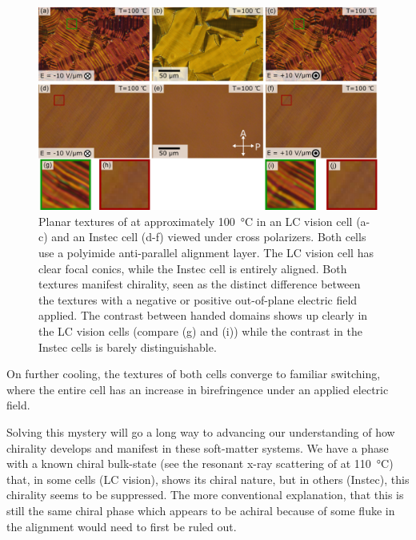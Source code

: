 \documentclass[aagreenthesis]{subfiles}
\begin{document}
\begin{figure}[h!]
    \centering
\includegraphics[width=\textwidth]{figs/pal30/future/LCvIn100.png}
    \caption{\label{fig:future:n161t100}  Planar textures of \nsix{} at
        approximately \SI{100}{\degreeCelsius} in an LC vision cell
    (a-c) and an Instec cell (d-f) viewed under cross polarizers. Both cells use a polyimide anti-parallel
alignment layer. The LC vision cell has clear focal conics, while the Instec
cell is entirely aligned. Both textures manifest chirality, seen as the distinct
difference between the textures with a negative or positive out-of-plane
electric field applied. The contrast between handed domains shows up clearly in
the LC vision cells (compare (g) and (i)) while the contrast in the Instec cells
is barely distinguishable. }
\end{figure}

On further cooling, the textures of both cells converge to familiar \smcapf{}
switching, where the entire cell has an increase in birefringence under an
applied electric field. 

Solving this mystery will go a long way to advancing our understanding of how
chirality develops and manifest in these soft-matter systems. We have a phase
with a known chiral bulk-state (see the resonant x-ray scattering of \nsix{} at
\SI{110}{\degreeCelsius}) that, in some cells (LC vision), shows its chiral nature, but in
others (Instec), this chirality seems to be suppressed. The more conventional
explanation, that this is still the same chiral \smcpalpha{} phase which appears
to be achiral because of some fluke in the alignment would need to first be
ruled out. 
\end{document}
